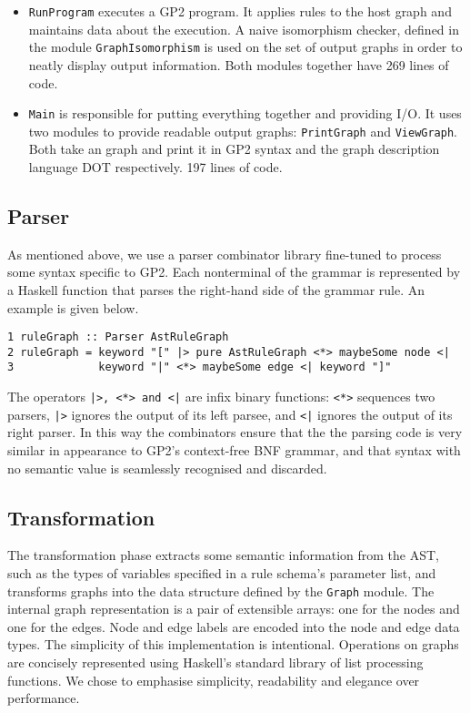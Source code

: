 \begin{itemize}
\item \texttt{RunProgram} executes a GP2 program. It applies rules to the host graph and maintains data about the execution. A naive isomorphism checker, defined in the module \texttt{GraphIsomorphism} is used on the set of output graphs in order to neatly display output information. Both modules together have 269 lines of code.
\item \texttt{Main} is responsible for putting everything together and providing I/O. It uses two modules to provide readable output graphs: \texttt{PrintGraph} and \texttt{ViewGraph}. Both take an graph and print it in GP2 syntax and the graph description language DOT respectively. 197 lines of code.
\end{itemize}

\subsection{Parser}

As mentioned above, we use a parser combinator library fine-tuned to process some syntax specific to GP2. Each nonterminal of the grammar is represented by a Haskell function that parses the right-hand side of the grammar rule. An example is given below.

\begin{verbatim}
1 ruleGraph :: Parser AstRuleGraph
2 ruleGraph = keyword "[" |> pure AstRuleGraph <*> maybeSome node <| 
3             keyword "|" <*> maybeSome edge <| keyword "]"
\end{verbatim}

The operators \texttt{|>, <*> and <|} are infix binary functions: \texttt{<*>} sequences two parsers, \texttt{|>} ignores the output of its left parsee, and \texttt{<|} ignores the output of its right parser. In this way the combinators ensure that the the parsing code is very similar in appearance to GP2's context-free BNF grammar, and that syntax with no semantic value is seamlessly recognised and discarded.

\subsection{Transformation}

The transformation phase extracts some semantic information from the AST, such as the types of variables specified in a rule schema's parameter list, and transforms graphs into the data structure defined by the \texttt{Graph} module. The internal graph representation is a pair of extensible arrays: one for the nodes and one for the edges. Node and edge labels are encoded into the node and edge data types. The simplicity of this implementation is intentional. Operations on graphs are concisely represented using Haskell's standard library of list processing functions. We chose to emphasise simplicity, readability and elegance over performance. 

